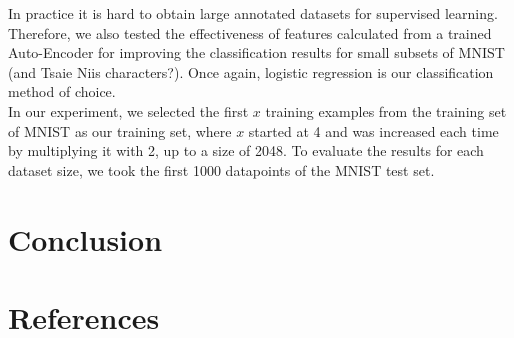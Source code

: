 \documentclass{article}
\begin{document}
In practice it is hard to obtain large annotated datasets for supervised learning. Therefore, we also tested the effectiveness of features calculated from a trained Auto-Encoder for improving the classification results for small subsets of MNIST (and Tsaie Niis characters?). Once again, logistic regression is our classification method of choice. \\ In our experiment, we selected the first $x$ training examples from the training set of MNIST as our training set, where $x$ started at 4 and was increased each time by multiplying it with 2, up to a size of 2048. To evaluate the results for each dataset size, we took the first 1000 datapoints of the MNIST test set.

\section*{Conclusion}



\pagebreak 
\section*{References}


\end{document}
